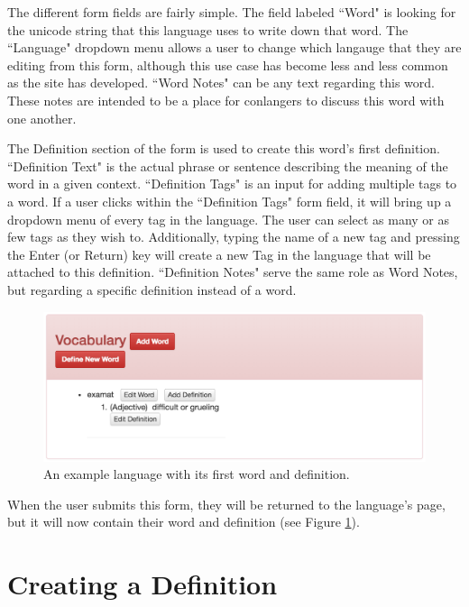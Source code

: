 The different form fields are fairly simple. The field labeled ``Word" is looking for the unicode string that this language uses to write down that word. The ``Language" dropdown menu allows a user to change which langauge that they are editing from this form, although this use case has become less and less common as the site has developed. ``Word Notes" can be any text regarding this word. These notes are intended to be a place for conlangers to discuss this word with one another.

The Definition section of the form is used to create this word's first definition. ``Definition Text" is the actual phrase or sentence describing the meaning of the word in a given context. ``Definition Tags" is an input for adding multiple tags to a word. If a user clicks within the ``Definition Tags" form field, it will bring up a dropdown menu of every tag in the language. The user can select as many or as few tags as they wish to. Additionally, typing the name of a new tag and pressing the Enter (or Return) key will create a new Tag in the language that will be attached to this definition. ``Definition Notes" serve the same role as Word Notes, but regarding a specific definition instead of a word.

\begin{figure}[h]
\includegraphics[width=\textwidth]{figures/example-language-one-word-logged-in}
\caption{An example language with its first word and definition.}
\centering
\label{fig:example-language-one-word-logged-in}
\end{figure}

When the user submits this form, they will be returned to the language's page, but it will now contain
their word and definition (see Figure \ref{fig:example-language-one-word-logged-in}).

\section{Creating a Definition}
\label{sec:create-definition}

